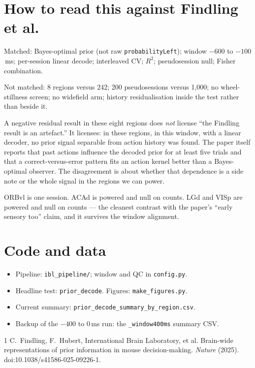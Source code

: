 \documentclass[11pt,a4paper]{article}
\begin{document}
\section{How to read this against Findling et al.}

Matched: Bayes-optimal prior (not raw \texttt{probabilityLeft}); window
$-600$ to $-100$\,ms; per-session linear decode; interleaved CV; $R^2$;
pseudosession null; Fisher combination.

Not matched: 8 regions versus 242; 200 pseudosessions versus 1{,}000; no
wheel-stillness screen; no widefield arm; history residualisation inside the
test rather than beside it.

A negative residual result in these eight regions does \emph{not} license
``the Findling result is an artefact.'' It licenses: in these regions, in this
window, with a linear decoder, no prior signal separable from action history
was found. The paper itself reports that past actions influence the decoded
prior for at least five trials and that a correct-versus-error pattern fits an
action kernel better than a Bayes-optimal observer. The disagreement is about
whether that dependence is a side note or the whole signal in the regions we
can power.

ORBvl is one session. ACAd is powered and null on counts. LGd and VISp are
powered and null on counts --- the cleanest contrast with the paper's ``early
sensory too'' claim, and it survives the window alignment.

\section{Code and data}

\begin{itemize}
\item Pipeline: \texttt{ibl\_pipeline/}; window and QC in \texttt{config.py}.
\item Headline test: \texttt{prior\_decode}. Figures: \texttt{make\_figures.py}.
\item Current summary: \texttt{prior\_decode\_summary\_by\_region.csv}.
\item Backup of the $-400$ to $0$\,ms run: the \texttt{\_window400ms} summary CSV.
\end{itemize}

\begin{thebibliography}{1}
C.~Findling, F.~Hubert, International Brain Laboratory, et al.
\newblock Brain-wide representations of prior information in mouse decision-making.
\newblock \emph{Nature} (2025).
\newblock doi:10.1038/s41586-025-09226-1.
\end{thebibliography}
\end{document}
